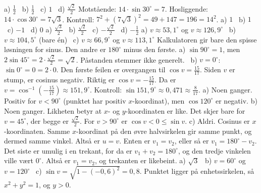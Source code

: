  a) $\frac12$ \ b) $\frac12$ \ c) $1$ \ d) $\frac{\sqrt2}{2}$
 Motstående: $14 \cdot \sin 30^\circ = 7$. Hosliggende: $14 \cdot \cos 30^\circ = 7\sqrt3$. Kontroll: $7^2 + (7\sqrt3)^2 = 49 + 147 = 196 = 14^2$.
 a) $1$ \ b) $1$ \ c) $-1$ \ d) $0$
 a) $\frac{\sqrt3}{2}$ \ b) $\frac{\sqrt2}{2}$ \ c) $-\frac{\sqrt2}{2}$ \ d) $-\frac12$
 a) $v \approx 53,1^\circ$ og $v \approx 126,9^\circ$ \ b) $v \approx 104,5^\circ$ (bare én) \ c) $v \approx 66,9^\circ$ og $v \approx 113,1^\circ$
Kalkulatoren gir bare den spisse løsningen for sinus. Den andre er $180^\circ$ minus den første.
 a) $\sin 90^\circ = 1$, men $2\sin 45^\circ = 2 \cdot \frac{\sqrt2}{2} = \sqrt2$. Påstanden stemmer ikke generelt. \ b) $v = 0^\circ$: $\sin 0^\circ = 0 = 2 \cdot 0$.
 Den første feilen er overgangen til $\cos v = \frac{15}{17}$. Siden $v$ er stump, er cosinus negativ. Riktig er $\cos v = -\frac{15}{17}$.
Da er $v = \cos^{-1}\!\left(-\frac{15}{17}\right) \approx 151,9^\circ$. Kontroll: $\sin 151,9^\circ \approx 0,471 \approx \frac{8}{17}$.
 a) Noen ganger. Positiv for $v < 90^\circ$ (punktet har positiv $x$-koordinat), men $\cos 120^\circ$ er negativ.
b) Noen ganger. Likheten betyr at $x$- og $y$-koordinaten er like. Det skjer bare for $v = 45^\circ$, der begge er $\frac{\sqrt2}{2}$. For $v > 90^\circ$ er $\cos v < 0 \le \sin v$.
c) Aldri. Cosinus er $x$-koordinaten. Samme $x$-koordinat på den øvre halvsirkelen gir samme punkt, og dermed samme vinkel. Altså er $u = v$.
 Enten er $v_1 = v_2$, eller så er $v_1 = 180^\circ - v_2$. Det siste er umulig i en trekant, for da er $v_1 + v_2 = 180^\circ$, og den tredje vinkelen ville vært $0^\circ$. Altså er $v_1 = v_2$, og trekanten er likebeint.
 a) $\sqrt3$ \ b) $v = 60^\circ$ og $v = 120^\circ$ \ c) $\sin v = \sqrt{1 - (-0,6)^2} = 0,8$. Punktet ligger på enhetssirkelen, så $x^2 + y^2 = 1$, og $y > 0$.

